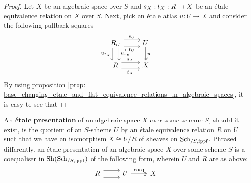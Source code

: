                 \begin{proof}
                    Let $X$ be an algebraic space over $S$ and $s_X: t_X: R \rightrightarrows X$ be an \'etale equivalence relation on $X$ over $S$. Next, pick an \'etale atlas $u: U \to X$ and consider the following pullback squares:
                        $$
                            \begin{tikzcd}
                            	{R_U} & U \\
                            	R & X
                            	\arrow["u", two heads, from=1-2, to=2-2]
                            	\arrow["{t_X}"', shift right=2, from=2-1, to=2-2]
                            	\arrow["{s_X}", shift left=2, from=2-1, to=2-2]
                            	\arrow["{u_{s_X}}", shift left=2, from=1-1, to=2-1]
                            	\arrow["{u_{t_X}}"', shift right=2, from=1-1, to=2-1]
                            	\arrow["{t_U}"', shift right=2, from=1-1, to=1-2]
                            	\arrow["{s_U}", shift left=2, from=1-1, to=1-2]
                            	\arrow["\lrcorner"{anchor=center, pos=0.125}, draw=none, from=1-1, to=2-2]
                            \end{tikzcd}
                        $$
                    By using proposition \ref{prop: base_changing_etale_and_flat_equivalence_relations_in_algebraic_spaces}, it is easy to see that 
                \end{proof}
            \begin{definition} \label{def: etale_presentations_of_algebraic_spaces}
                An \textbf{\'etale presentation} of an algebraic space $X$ over some scheme $S$, should it exist, is the quotient of an $S$-scheme $U$ by an \'etale equivalence relation $R$ on $U$ such that we have an isomorphism $X \cong U/R$ of sheaves on $\mathrm{Sch}_{/S, \mathrm{fppf}}$. Phrased differently, an \'etale presentation of an algebraic space $X$ over some scheme $S$ is a coequaliser in $\mathrm{Sh}(\mathrm{Sch}_{/S, \mathrm{fppf}})$ of the following form, wherein $U$ and $R$ are as above:
                    $$
                        \begin{tikzcd}
                        	R & U & X
                        	\arrow[shift right=2, from=1-1, to=1-2]
                        	\arrow[shift left=2, from=1-1, to=1-2]
                        	\arrow["\coeq", two heads, from=1-2, to=1-3]
                        \end{tikzcd}
                    $$
            \end{definition}
